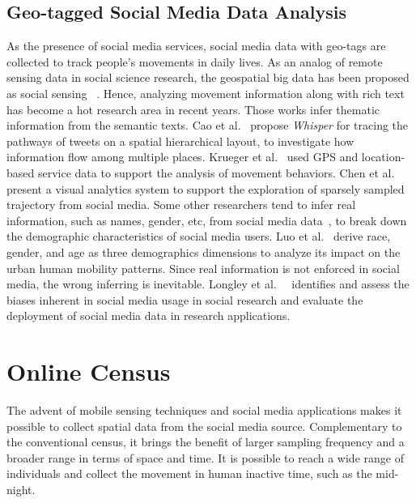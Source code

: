 \subsection{Geo-tagged Social Media Data Analysis}
As the presence of social media services, social media data with geo-tags are collected to track people's movements in daily lives. As an analog of remote sensing data in social science research, the geospatial big data has been proposed as social sensing ~\citep{liu2015social}. Hence, analyzing movement information along with rich text has become a hot research area in recent years. Those works infer thematic information from the semantic texts. Cao et al.~\citep{cao2012whisper} propose \textit{Whisper} for tracing the pathways of tweets on a spatial hierarchical layout, to investigate how information flow among multiple places. Krueger et al.~\citep{krueger2014visual} used GPS and location-based service data to support the analysis of movement behaviors. Chen et al.~\citep{chen2016interactive} present a visual analytics system to support the exploration of sparsely sampled trajectory from social media. Some other researchers tend to infer real information, such as names, gender, etc, from social media data~\citep{peddinti2014internet}, to break down the demographic characteristics of social media users. Luo et al.~\citep{luo2016explore} derive race, gender, and age as three demographics dimensions to analyze its impact on the urban human mobility patterns. Since real information is not enforced in social media, the wrong inferring is inevitable. Longley et al.~\citep{Longley2015}~\citep{Paul2016_twitter} identifies and assess the biases inherent in social media usage in social research and evaluate the deployment of social media data in research applications.



\section{Online Census}
The advent of mobile sensing techniques and social media applications makes it possible to collect spatial data from the social media source. Complementary to the conventional census, it brings the benefit of larger sampling frequency and a broader range in terms of space and time. It is possible to reach a wide range of individuals and collect the movement in human inactive time, such as the mid-night.

